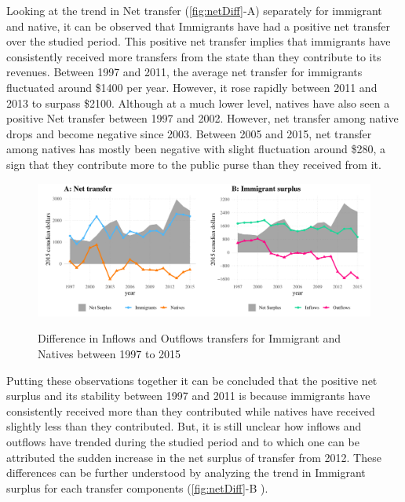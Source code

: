   \vspace{0.7em}\par
  Looking at the trend in Net transfer (\autoref{fig:netDiff}-A) separately for immigrant and native, it can be observed that Immigrants have had a positive net transfer over the studied period.
This positive net transfer implies that immigrants have consistently received more transfers from the state than they contribute to its revenues.
Between 1997 and 2011, the average net transfer for immigrants fluctuated around \$1400 per year.
However, it rose rapidly between 2011 and 2013 to surpass \$2100.
Although at a much lower level, natives have also seen a positive Net transfer between 1997 and 2002.
However, net transfer among native drops and become negative since 2003.
Between 2005 and 2015, net transfer among natives has mostly been negative with slight fluctuation around \$280, a sign that they contribute more to the public purse than they received from it.

  \begin{figure}[H]%
    \caption{Difference in Inflows and Outflows transfers for Immigrant and Natives between 1997 to 2015}
    \includegraphics[width=1\textwidth]{res/netDiff.pdf}%
    \label{fig:netDiff}%
\end{figure}%

  \vspace{0.7em}\par
  Putting these observations together it can be concluded that the positive net surplus and its stability between 1997 and 2011 is because immigrants have consistently received more than they contributed while natives have received slightly less than they contributed.
But, it is still unclear how inflows and outflows have trended during the studied period and to which one can be attributed the sudden increase in the net surplus of transfer from 2012.
These differences can be further understood by analyzing the trend in Immigrant surplus for each transfer components (\autoref{fig:netDiff}-B ).

